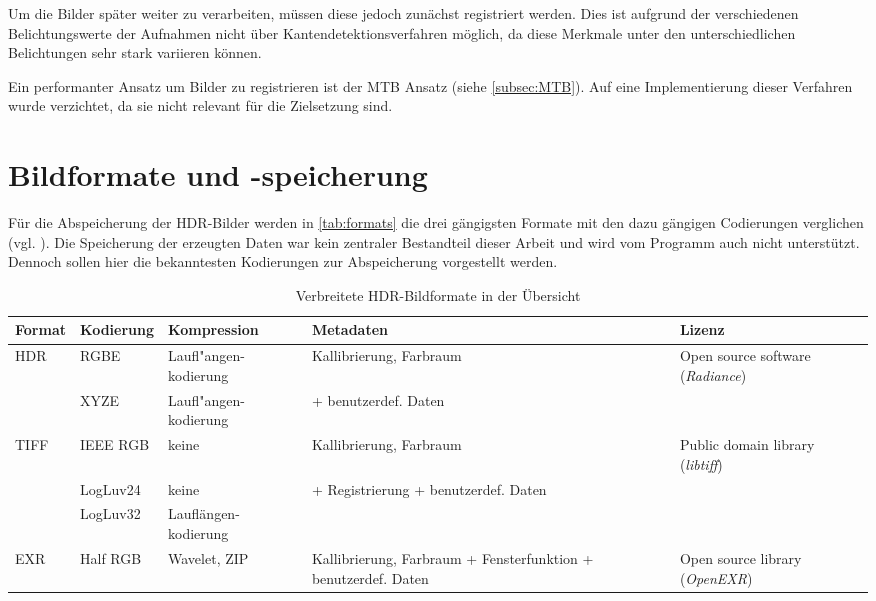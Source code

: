Um die Bilder später weiter zu verarbeiten, müssen diese jedoch zunächst registriert werden. Dies ist aufgrund der verschiedenen Belichtungswerte der Aufnahmen nicht über Kantendetektionsverfahren möglich, da diese Merkmale unter den unterschiedlichen Belichtungen sehr stark variieren können.

Ein performanter Ansatz um Bilder zu registrieren ist der \gls{MTB} Ansatz (siehe \autoref{subsec:MTB}). Auf eine Implementierung dieser Verfahren wurde verzichtet, da sie nicht relevant für die Zielsetzung sind.

\section{Bildformate und -speicherung}

Für die Abspeicherung der \gls{HDR}-Bilder werden in \autoref{tab:formats} die drei gängigsten Formate mit den dazu gängigen Codierungen verglichen (vgl. \cite{Reinhard}). Die Speicherung der erzeugten Daten war kein zentraler Bestandteil dieser Arbeit und wird vom Programm auch nicht unterstützt. Dennoch sollen hier die bekanntesten Kodierungen zur Abspeicherung vorgestellt werden.


\begin{table}
  \begin{center}
    \small
    \begin{tabularx}{\textwidth}{l|XXXX}
	\toprule
	Format & Kodierung & Kompression & Metadaten & Lizenz \\
	\midrule
	HDR & RGBE & Laufl"angen-\newline kodierung & Kallibrierung, \newline Farbraum & Open source software (\textit{Radiance})\\
	& XYZE & Laufl"angen-\newline kodierung & + benutzerdef. Daten & \\
	\midrule
	TIFF & IEEE RGB & keine & Kallibrierung, \newline Farbraum & Public domain library (\textit{libtiff})\\
	& LogLuv24 & keine & + Registrierung \newline + benutzerdef. Daten& \\
	& LogLuv32 & Lauflängen-\newline kodierung & & \\
	\midrule
	EXR & Half RGB & Wavelet, ZIP & Kallibrierung, \newline Farbraum \newline+ Fensterfunktion \newline + benutzerdef. Daten & Open source library (\textit{OpenEXR})\\
	\bottomrule
    \end{tabularx}
    \normalsize
    \caption{Verbreitete HDR-Bildformate in der Übersicht \cite[S.89]{Reinhard}}
    \label{tab:formats}
  \end{center}
\end{table}


